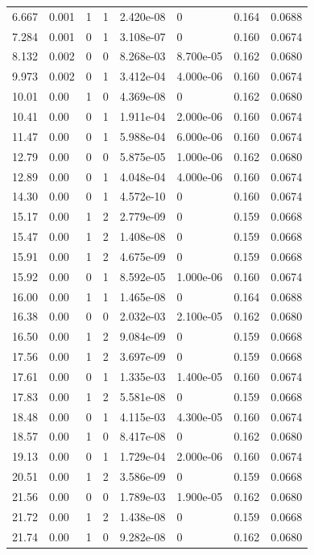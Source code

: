 \documentclass[preview]{standalone}
\begin{document}
{{\begin{tabular}{L{1.2cm}C{1.2cm} C{0.3cm}C{0.5cm} C{1.4cm}C{1.4cm} C{1.4cm}C{1.4cm}}
  6.667  &  0.001  & 1     &  1 &  2.420e-08  & 0  & 0.164 &  0.0688   \\ 
  7.284  &  0.001  & 0     &  1 &  3.108e-07  & 0  & 0.160 &  0.0674   \\ 
  8.132  &  0.002  & 0     &  0 &  8.268e-03  & 8.700e-05  & 0.162 &  0.0680   \\ 
  9.973  &  0.002  & 0     &  1 &  3.412e-04  & 4.000e-06  & 0.160 &  0.0674   \\ 
  10.01  &  0.00  & 1     &  0 &  4.369e-08  & 0  & 0.162 &  0.0680   \\ 
  10.41  &  0.00  & 0     &  1 &  1.911e-04  & 2.000e-06  & 0.160 &  0.0674   \\ 
  11.47  &  0.00  & 0     &  1 &  5.988e-04  & 6.000e-06  & 0.160 &  0.0674   \\ 
  12.79  &  0.00  & 0     &  0 &  5.875e-05  & 1.000e-06  & 0.162 &  0.0680   \\ 
  12.89  &  0.00  & 0     &  1 &  4.048e-04  & 4.000e-06  & 0.160 &  0.0674   \\ 
  14.30  &  0.00  & 0     &  1 &  4.572e-10  & 0  & 0.160 &  0.0674   \\ 
  15.17  &  0.00  & 1     &  2 &  2.779e-09  & 0  & 0.159 &  0.0668   \\ 
  15.47  &  0.00  & 1     &  2 &  1.408e-08  & 0  & 0.159 &  0.0668   \\ 
  15.91  &  0.00  & 1     &  2 &  4.675e-09  & 0  & 0.159 &  0.0668   \\ 
  15.92  &  0.00  & 0     &  1 &  8.592e-05  & 1.000e-06  & 0.160 &  0.0674   \\ 
  16.00  &  0.00  & 1     &  1 &  1.465e-08  & 0  & 0.164 &  0.0688   \\ 
  16.38  &  0.00  & 0     &  0 &  2.032e-03  & 2.100e-05  & 0.162 &  0.0680   \\ 
  16.50  &  0.00  & 1     &  2 &  9.084e-09  & 0  & 0.159 &  0.0668   \\ 
  17.56  &  0.00  & 1     &  2 &  3.697e-09  & 0  & 0.159 &  0.0668   \\ 
  17.61  &  0.00  & 0     &  1 &  1.335e-03  & 1.400e-05  & 0.160 &  0.0674   \\ 
  17.83  &  0.00  & 1     &  2 &  5.581e-08  & 0  & 0.159 &  0.0668   \\ 
  18.48  &  0.00  & 0     &  1 &  4.115e-03  & 4.300e-05  & 0.160 &  0.0674   \\ 
  18.57  &  0.00  & 1     &  0 &  8.417e-08  & 0  & 0.162 &  0.0680   \\ 
  19.13  &  0.00  & 0     &  1 &  1.729e-04  & 2.000e-06  & 0.160 &  0.0674   \\ 
  20.51  &  0.00  & 1     &  2 &  3.586e-09  & 0  & 0.159 &  0.0668   \\ 
  21.56  &  0.00  & 0     &  0 &  1.789e-03  & 1.900e-05  & 0.162 &  0.0680   \\ 
  21.72  &  0.00  & 1     &  2 &  1.438e-08  & 0  & 0.159 &  0.0668   \\ 
  21.74  &  0.00  & 1     &  0 &  9.282e-08  & 0  & 0.162 &  0.0680   \\ 
\hline 
\end{tabular} 

}}
\end{document}
